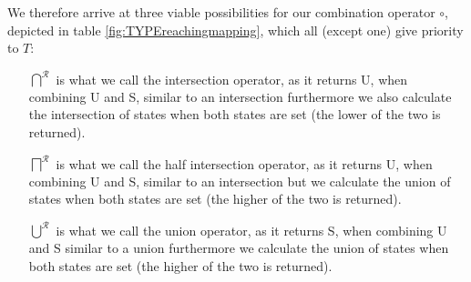 We therefore arrive at three viable possibilities for our combination operator $\circ$, depicted in table \ref{fig:TYPEreachingmapping}, 
which all (except one) give priority to $T$:
\begin{itemize}
\item [$\bigcap^{\mathcal{R}}$] is what we call the intersection operator, as it returns U, when combining U and S, similar to an 
intersection furthermore we also calculate the intersection of states when both states are set 
(the lower of the two is returned).
\item [$\bigsqcap^{\mathcal{R}}$] is what we call the half intersection operator, as it returns U, when combining U and S, 
similar to an intersection but we calculate the union of states when both states are set (the higher of the two is returned).
\item [$\bigcup^{\mathcal{R}}$] is what we call the union operator, as it returns S, when combining U and S similar to a union
furthermore we calculate the union of states when both states are set (the higher of the two is returned).
\end{itemize}

\begin{table}

{}

\caption{Different mappings for combining two reaching state values in horizontal matching for the \emph{type} policy.}
\label{fig:TYPEreachingmapping}
\end{table}

